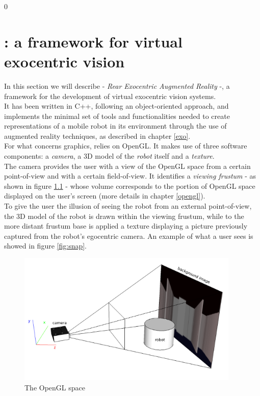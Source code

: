 \setcounter{figure}{0}
\setcounter{table}{0}
\setcounter{lstlisting} {0}

\chapter{\framework{}: a framework for virtual exocentric vision}
\label{rear}
\minitoc

In this section we will describe \framework{} - 
\textit{Rear Exocentric Augmented Reality} -, a framework 
for the development of virtual exocentric vision systems.
\\
It has been written in C++, following an object-oriented 
approach, and implements the minimal set of tools and functionalities 
needed to create representations of a mobile robot in its environment 
through the use of augmented reality techniques, as described in 
chapter \ref{exo}.
\\
For what concerns graphics, \framework{} relies on OpenGL.
It makes use of three software components: a \textit{camera}, 
a 3D model of the \textit{robot} itself and a \textit{texture}.
\\
The camera provides the user with a view of the OpenGL space 
from a certain point-of-view and with a certain field-of-view. 
It identifies a \textit{viewing frustum} - as shown in figure 
\ref{fig:openglspace} - whose volume corresponds to the 
portion of OpenGL space displayed on the user's screen (more
details in chapter \ref{opengl}).
\\
To give the user the illusion of seeing the robot from an 
external point-of-view, the 3D model of the robot is drawn 
within the viewing frustum, while to the more distant frustum base 
is applied a texture displaying a picture previously 
captured from the robot's egocentric camera.
An example of what a user sees is showed in figure \ref{fig:snap}.
\begin{figure}[!h]
  \begin{center}
    \includegraphics[width=300pt]{img/camera_frustum_scheme.png}
    \caption{The OpenGL space}
    \label{fig:openglspace}
  \end{center}
\end{figure}

